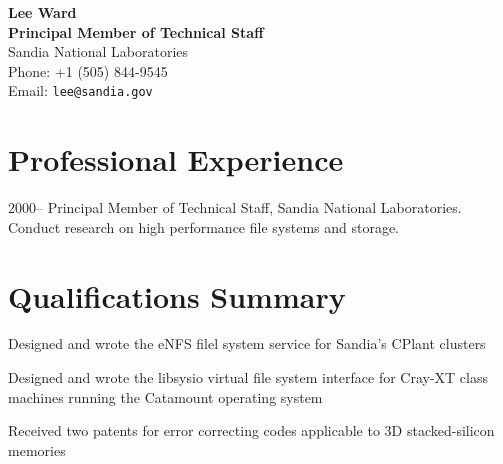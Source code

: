 \documentclass[11pt]{nsfcv}
\begin{document}
\begin{center}
  {\bf\Large Lee Ward} \\
  {\bf\Large Principal Member of Technical Staff} \\
  Sandia National Laboratories \\
  Phone: +1 (505) 844-9545 \\
  Email: \verb+lee@sandia.gov+
\end{center}


\section*{Professional Experience}
\begin{yearlist}

\item[2000--\hfill]
  Principal Member of Technical Staff, Sandia National Laboratories. Conduct research
  on high performance file systems and storage.

\end{yearlist}

\section*{Qualifications Summary}

\begin{itemtight}
\item Designed and wrote the eNFS filel system service for Sandia's CPlant clusters
\item Designed and wrote the libsysio virtual file system interface for Cray-XT class
  machines running the Catamount operating system
\item Received two patents for error correcting codes applicable to 3D stacked-silicon memories
\end{itemtight}
\end{document}
